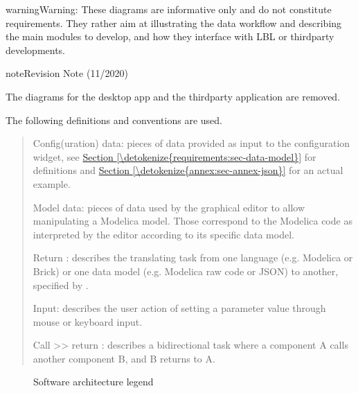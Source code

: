 \documentclass[letterpaper,10pt, openany,english]{sphinxmanual}
\begin{document}
\begin{sphinxadmonition}{warning}{Warning:}
These diagrams are informative only and do not constitute requirements. They rather aim at illustrating the data workflow and describing the main modules to develop, and how they interface with LBL or third\sphinxhyphen{}party developments.
\end{sphinxadmonition}

\begin{sphinxadmonition}{note}{Revision Note (11/2020)}

The diagrams for the desktop app and the third\sphinxhyphen{}party application are removed.
\end{sphinxadmonition}

The following definitions and conventions are used.
\begin{quote}

Config(uration) data: pieces of data provided as input to the configuration widget, see \hyperref[\detokenize{requirements:sec-data-model}]{Section \ref{\detokenize{requirements:sec-data-model}}} for definitions and \hyperref[\detokenize{annex:sec-annex-json}]{Section \ref{\detokenize{annex:sec-annex-json}}} for an actual example.

Model data: pieces of data used by the graphical editor to allow manipulating a Modelica model. Those correspond to the Modelica code as interpreted by the editor according to its specific data model.

Return : describes the translating task from one language (e.g. Modelica or Brick) or one data model (e.g. Modelica raw code or JSON) to another, specified by .

Input: describes the user action of setting a parameter value through mouse or keyboard input.

Call \textgreater{}\textgreater{} return : describes a bidirectional task where a component A calls another component B, and B returns  to A.
\end{quote}

\begin{figure}[htbp]
\centering
\capstart

\noindent{}
\caption{Software architecture legend}\label{\detokenize{architecture:linkage-architecture-legend}}\end{figure}
\end{document}
